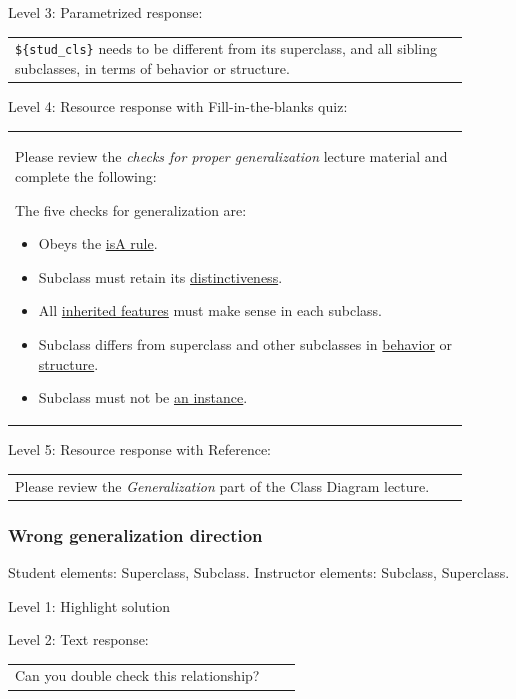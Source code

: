 \noindent Level 3: Parametrized response: \medskip

\begin{tabular}{|p{0.9\linewidth}}
\verb|${stud_cls}| needs to be different from its superclass, and all sibling subclasses, in terms of behavior or structure.
\end{tabular} \medskip

\noindent Level 4: Resource response with Fill-in-the-blanks quiz: \medskip

\begin{tabular}{|p{0.9\linewidth}}

Please review the \textit{checks for proper generalization} lecture material
and complete the following:

The five checks for generalization are:

\begin{itemize}
    \item Obeys the \underline{isA rule}.
    \item Subclass must retain its \underline{distinctiveness}.
    \item All \underline{inherited features} must make sense in each subclass.
    \item Subclass differs from superclass and other subclasses in \underline{behavior} or \underline{structure}.
    \item Subclass must not be \underline{an instance}.
\end{itemize}

\end{tabular} \medskip

\noindent Level 5: Resource response with Reference: \medskip

\begin{tabular}{|p{0.9\linewidth}}
Please review the \textit{Generalization} part of the Class Diagram lecture.
\end{tabular} \medskip


\subsubsection{Wrong generalization direction}

Student elements: Superclass, Subclass. Instructor elements: Subclass, Superclass. \medskip

\noindent Level 1: Highlight solution  \medskip

\noindent Level 2: Text response: \medskip

\begin{tabular}{|p{0.9\linewidth}}
Can you double check this relationship?
\end{tabular} \medskip


